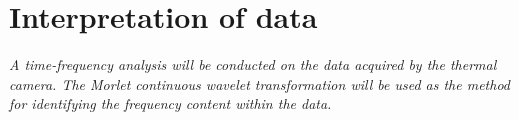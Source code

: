 \chapter{Interpretation of data}
\textit{A time-frequency analysis will be conducted on the data acquired by the thermal camera. The Morlet continuous wavelet transformation will be used as the method for identifying the frequency content within the data.}